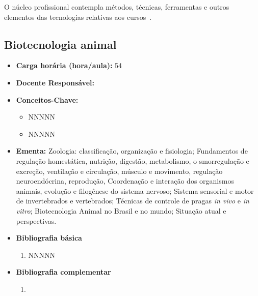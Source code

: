 \documentclass[11pt,fleqn]{book} %
\begin{document}
O núcleo profissional contempla métodos, técnicas, ferramentas e outros elementos das tecnologias relativas aos cursos~\cite{Resolucao06De2012}.

\newpage
\subsection{Biotecnologia animal}\label{disc:biotecAnimal}
\begin{itemize}
	\item \textbf{Carga horária (hora/aula):} 54
	\item \textbf{Docente Responsável:}
	\item \textbf{Conceitos-Chave:}
	\begin{itemize}
		\item NNNNN
		\item NNNNN
	\end{itemize}
	\item \textbf{Ementa:} 
	Zoologia: classificação, organização e fisiologia;
	Fundamentos de regulação homestática, nutrição, digestão, metabolismo, o smorregulação e excreção, ventilação e circulação, músculo e movimento, regulação neuroendócrina, reprodução, Coordenação e interação dos organismos animais, evolução e filogênese do sistema nervoso; 
	Sistema sensorial e motor de invertebrados e vertebrados; 
	Técnicas de controle de pragas \textit{in vivo} e \textit{in vitro};
	Biotecnologia Animal no Brasil e no mundo; 
	Situação atual e perspectivas.
	\item \textbf{Bibliografia básica}
	\begin{enumerate}
		\item NNNNN
	\end{enumerate}
	\item \textbf{Bibliografia complementar}
	\begin{enumerate}
		\item 
	\end{enumerate}	
\end{itemize}


\newpage
\end{document}
